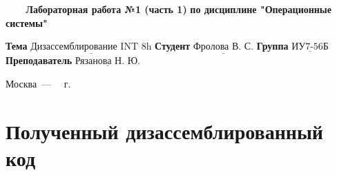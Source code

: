 \documentclass[a4paper,12pt]{article}
\begin{document}
\begin{center}
	\noindent\begin{minipage}{1.3\textwidth}\centering
	\Large\textbf{   ~~~ Лабораторная работа №1 (часть 1)}\newline
	\textbf{по дисциплине "Операционные системы"}\newline\newline\newline
	\end{minipage}
\end{center}

\noindent\textbf{Тема} $\underline{\text{Дизассемблирование INT 8h}}$\newline\newline
\noindent\textbf{Студент} $\underline{\text{Фролова В. С.}}$\newline\newline
\noindent\textbf{Группа} $\underline{\text{ИУ7-56Б}}$\newline\newline
\noindent\textbf{Преподаватель} $\underline{\text{Рязанова Н. Ю.}}$\newline

\begin{center}
	\vfill
	Москва~---~\the\year
~г.
\end{center}
\clearpage


\section{Полученный дизассемблированный код}
\end{document}
